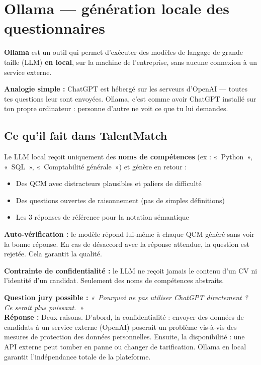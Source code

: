 \documentclass[12pt,a4paper]{article}
\newenvironment{simplification}{%
  \def\FrameCommand{\fboxsep=8pt\colorbox{green!10}}%
  \MakeFramed{\advance\hsize-\width \FrameRestore}%
  \vspace{-4pt}%
}{\endMakeFramed}
\newenvironment{jury}{%
  \def\FrameCommand{\fboxsep=8pt\colorbox{orange!12}}%
  \MakeFramed{\advance\hsize-\width \FrameRestore}%
  \vspace{-4pt}%
}{\endMakeFramed}
\newcommand{\concept}[1]{\textbf{\color{bleu}#1}}
\begin{document}
\newpage

\section{Ollama — génération locale des questionnaires}

\concept{Ollama} est un outil qui permet d'exécuter des modèles de langage de grande taille (LLM) \textbf{en local}, sur la machine de l'entreprise, sans aucune connexion à un service externe.

\begin{simplification}
\textbf{Analogie simple :}
ChatGPT est hébergé sur les serveurs d'OpenAI — toutes tes questions leur sont envoyées. Ollama, c'est comme avoir ChatGPT installé sur ton propre ordinateur : personne d'autre ne voit ce que tu lui demandes.
\end{simplification}

\subsection{Ce qu'il fait dans TalentMatch}

Le LLM local reçoit uniquement des \textbf{noms de compétences} (ex : «~Python~», «~SQL~», «~Comptabilité générale~») et génère en retour :
\begin{itemize}
  \item Des QCM avec distracteurs plausibles et paliers de difficulté
  \item Des questions ouvertes de raisonnement (pas de simples définitions)
  \item Les 3 réponses de référence pour la notation sémantique
\end{itemize}

\textbf{Auto-vérification :} le modèle répond lui-même à chaque QCM généré sans voir la bonne réponse. En cas de désaccord avec la réponse attendue, la question est rejetée. Cela garantit la qualité.

\textbf{Contrainte de confidentialité :} le LLM ne reçoit jamais le contenu d'un CV ni l'identité d'un candidat. Seulement des noms de compétences abstraits.

\begin{jury}
\textbf{Question jury possible :} \textit{«~Pourquoi ne pas utiliser ChatGPT directement ? Ce serait plus puissant.~»}\\[4pt]
\textbf{Réponse :} Deux raisons. D'abord, la confidentialité : envoyer des données de candidats à un service externe (OpenAI) poserait un problème vis-à-vis des mesures de protection des données personnelles. Ensuite, la disponibilité : une API externe peut tomber en panne ou changer de tarification. Ollama en local garantit l'indépendance totale de la plateforme.
\end{jury}
\end{document}
